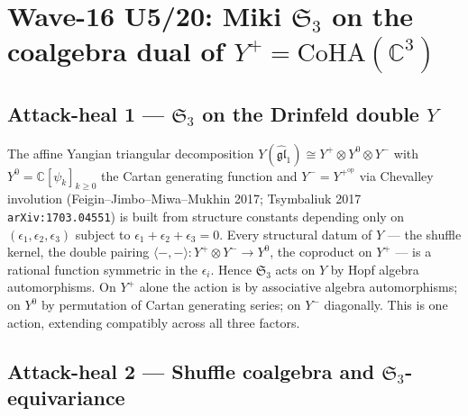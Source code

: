 \providecommand{\C}{\mathbb{C}}
\providecommand{\Z}{\mathbb{Z}}
\providecommand{\N}{\mathbb{N}}
\providecommand{\gl}{\mathfrak{gl}}
\providecommand{\gghone}{\widehat{\gl}_{1}}
\providecommand{\CoHA}{\mathrm{CoHA}}
\providecommand{\Winf}{\mathcal{W}_{1+\infty}}
\providecommand{\Yplus}{Y^{+}}
\providecommand{\Yminus}{Y^{-}}
\providecommand{\Yzero}{Y^{0}}
\providecommand{\Ydouble}{Y}
\providecommand{\Sthree}{\mathfrak{S}_{3}}
\providecommand{\Sh}{\mathrm{Sh}}
\providecommand{\Ran}{\mathrm{Ran}}
\providecommand{\Fact}{\mathrm{Fact}}
\providecommand{\kchir}{\kappa_{\mathrm{ch}}}
\providecommand{\kcat}{\kappa_{\mathrm{cat}}}
\providecommand{\kBKM}{\kappa_{\mathrm{BKM}}}
\providecommand{\ClaimStatusTheorem}{\textsc{[theorem]}}
\providecommand{\ClaimStatusConjectured}{\textsc{[conjectural]}}

\section*{Wave-16 U5/20: Miki $\Sthree$ on the coalgebra dual of $\Yplus = \CoHA(\C^{3})$}

\subsection*{Attack-heal 1 --- $\Sthree$ on the Drinfeld double $\Ydouble$}

The affine Yangian triangular decomposition
$\Ydouble(\gghone) \cong \Yplus \otimes \Yzero \otimes \Yminus$
with $\Yzero = \C[\psi_{k}]_{k \geq 0}$ the Cartan generating function
and $\Yminus = \Yplus^{\mathrm{op}}$ via Chevalley involution
(Feigin--Jimbo--Miwa--Mukhin 2017; Tsymbaliuk 2017
\texttt{arXiv:1703.04551}) is built from structure constants depending
only on $(\epsilon_{1}, \epsilon_{2}, \epsilon_{3})$ subject to
$\epsilon_{1} + \epsilon_{2} + \epsilon_{3} = 0$.  Every
structural datum of $\Ydouble$ --- the shuffle kernel, the
double pairing $\langle -, - \rangle : \Yplus \otimes \Yminus \to
\Yzero$, the coproduct on $\Yplus$ --- is a rational function symmetric
in the $\epsilon_{i}$.  Hence $\Sthree$ acts on $\Ydouble$ by Hopf
algebra automorphisms.  On $\Yplus$ alone the action is by associative
algebra automorphisms; on $\Yzero$ by permutation of Cartan generating
series; on $\Yminus$ diagonally.  This is one action, extending
compatibly across all three factors.

\subsection*{Attack-heal 2 --- Shuffle coalgebra and $\Sthree$-equivariance}

